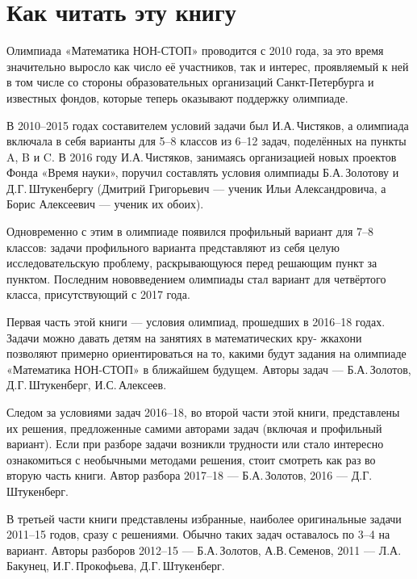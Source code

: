 \documentclass[10pt]{scrbook} \usepackage{modules/nonstahp_book}
\begin{document}
\chapter*{\TTfs Как читать эту книгу}\thispagestyle{empty}

\noindent\abz Олимпиада «Математика НОН-СТОП» проводится с 2010 года, за это время значительно выросло как число её участников, так и интерес, проявляемый к ней в том числе со стороны образовательных организаций Санкт-Петербурга и известных фондов, которые теперь оказывают поддержку олимпиаде.

\aabz В 2010–2015 годах составителем условий задачи был И.А.\,Чистяков, а олимпиада включала в себя варианты для 5–8 классов из 6–12 задач, поделённых на пункты A, B и C. В 2016 году И.А.\,Чистяков, занимаясь организацией новых проектов Фонда «Время науки», поручил составлять условия олимпиады Б.А.\,Золотову и Д.Г.\,Штукенбергу (Дмитрий Григорьевич — ученик Ильи Александровича, а Борис Алексеевич — ученик их обоих).

\aabz Одновременно с этим в олимпиаде появился профильный вариант для 7–8 классов: задачи профильного варианта представляют из себя целую исследовательскую проблему, раскрывающуюся перед решающим пункт за пунктом. Последним нововведением олимпиады стал вариант для четвёртого класса, присутствующий с 2017 года.

\aabz Первая часть этой книги — условия олимпиад, прошедших в 2016–18 годах. Задачи можно давать детям на занятиях в математических кру- жках\scolon они позволяют примерно ориентироваться на то, какими будут задания на олимпиаде «Математика НОН-СТОП» в ближайшем будущем. Авторы задач — Б.А.\,Золотов, Д.Г.\,Штукенберг, И.С.\,Алексеев.

\aabz Следом за условиями задач 2016–18, во второй части этой книги, представлены их решения, предложенные самими авторами задач (включая и профильный вариант). Если при разборе задачи возникли трудности или стало интересно ознакомиться с необычными методами решения, стоит смотреть как раз во вторую часть книги. Автор разбора 2017–18 — Б.А.\,Золотов, 2016 — Д.Г.\,Штукенберг.

\aabz В третьей части книги представлены избранные, наиболее оригинальные задачи 2011–15 годов, сразу с решениями. Обычно таких задач оставалось по 3–4 на вариант. Авторы разборов 2012–15 — Б.А.\,Золотов, А.В.\,Семенов, 2011 — Л.А.\,Бакунец, И.Г.\,Прокофьева, Д.Г.\,Штукенберг.
\end{document}
